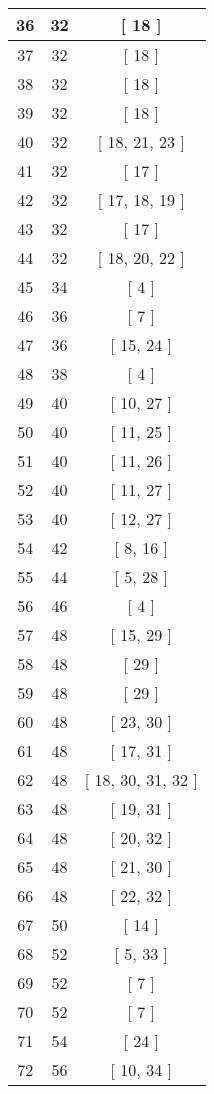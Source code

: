 \begin{center}
\begin{longtable}[H]{|| c c c ||}
36 & 32 & [ 18 ] \\ 
\hline
37 & 32 & [ 18 ] \\ 
\hline
38 & 32 & [ 18 ] \\ 
\hline
39 & 32 & [ 18 ] \\ 
\hline
40 & 32 & [ 18, 21, 23 ] \\ 
\hline
41 & 32 & [ 17 ] \\ 
\hline
42 & 32 & [ 17, 18, 19 ] \\ 
\hline
43 & 32 & [ 17 ] \\ 
\hline
44 & 32 & [ 18, 20, 22 ] \\ 
\hline
45 & 34 & [ 4 ] \\ 
\hline
46 & 36 & [ 7 ] \\ 
\hline
47 & 36 & [ 15, 24 ] \\ 
\hline
48 & 38 & [ 4 ] \\ 
\hline
49 & 40 & [ 10, 27 ] \\ 
\hline
50 & 40 & [ 11, 25 ] \\ 
\hline
51 & 40 & [ 11, 26 ] \\ 
\hline
52 & 40 & [ 11, 27 ] \\ 
\hline
53 & 40 & [ 12, 27 ] \\ 
\hline
54 & 42 & [ 8, 16 ] \\ 
\hline
55 & 44 & [ 5, 28 ] \\ 
\hline
56 & 46 & [ 4 ] \\ 
\hline
57 & 48 & [ 15, 29 ] \\ 
\hline
58 & 48 & [ 29 ] \\ 
\hline
59 & 48 & [ 29 ] \\ 
\hline
60 & 48 & [ 23, 30 ] \\ 
\hline
61 & 48 & [ 17, 31 ] \\ 
\hline
62 & 48 & [ 18, 30, 31, 32 ] \\ 
\hline
63 & 48 & [ 19, 31 ] \\ 
\hline
64 & 48 & [ 20, 32 ] \\ 
\hline
65 & 48 & [ 21, 30 ] \\ 
\hline
66 & 48 & [ 22, 32 ] \\ 
\hline
67 & 50 & [ 14 ] \\ 
\hline
68 & 52 & [ 5, 33 ] \\ 
\hline
69 & 52 & [ 7 ] \\ 
\hline
70 & 52 & [ 7 ] \\ 
\hline
71 & 54 & [ 24 ] \\ 
\hline
72 & 56 & [ 10, 34 ] \\ 

\end{longtable}
\end{center}
